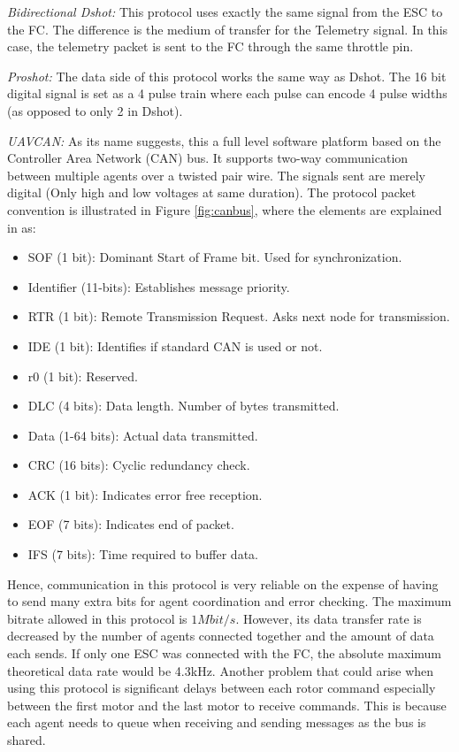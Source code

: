 \textit{Bidirectional Dshot:} This protocol uses exactly the same signal from the ESC to the FC. The difference is the medium of transfer for the Telemetry signal. In this case, the telemetry packet is sent to the FC through the same throttle pin.
\newline

\textit{Proshot: } The data side of this protocol works the same way as Dshot. The 16 bit digital signal is set as a 4 pulse train where each pulse can encode 4 pulse widths (as opposed to only 2 in Dshot).
\newline

\textit{UAVCAN: } As its name suggests, this a full level software platform based on the Controller Area Network (CAN) bus. It supports two-way communication between multiple agents over a twisted pair wire. The signals sent are merely digital (Only high and low voltages at same duration). The protocol packet convention is illustrated in Figure \ref{fig:canbus}, where the elements are explained in \cite{Corrigan2016} as:
\begin{itemize}
    \item SOF (1 bit): Dominant Start of Frame bit. Used for synchronization.
    \item Identifier (11-bits): Establishes message priority.
    \item RTR (1 bit): Remote Transmission Request. Asks next node for transmission.
    \item IDE (1 bit): Identifies if standard CAN is used or not.
    \item r0 (1 bit): Reserved.
    \item DLC (4 bits): Data length. Number of bytes transmitted.
    \item Data (1-64 bits): Actual data transmitted.
    \item CRC (16 bits): Cyclic redundancy check.
    \item ACK (1 bit): Indicates error free reception.
    \item EOF (7 bits): Indicates end of packet.
    \item IFS (7 bits): Time required to buffer data.
\end{itemize}

Hence, communication in this protocol is very reliable on the expense of having to send many extra bits for agent coordination and error checking. The maximum bitrate allowed in this protocol is $1Mbit/s$. However, its data transfer rate is decreased by the number of agents connected together and the amount of data each sends. If only one ESC was connected with the FC, the absolute maximum theoretical data rate would be 4.3kHz. Another problem that could arise when using this protocol is significant delays between each rotor command especially between the first motor and the last motor to receive commands. This is because each agent needs to queue when receiving and sending messages as the bus is shared.


